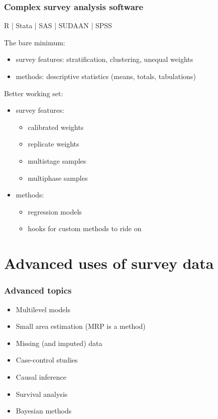 \documentclass{beamer}
\begin{document}
\begin{frame}\frametitle{Complex survey analysis software}

R | Stata | SAS | SUDAAN | SPSS

\bigskip

The bare minimum:
\begin{itemize}
    \item survey features: stratification, clustering, unequal weights
    \item methods: descriptive statistics (means, totals, tabulations)
\end{itemize}

Better working set:
\begin{itemize}
    \item survey features:
    \begin{itemize}
        \item calibrated weights
        \item replicate weights
        \item multistage samples
        \item multiphase samples
    \end{itemize}
    \item methods:
    \begin{itemize}
        \item regression models
        \item hooks for custom methods to ride on
    \end{itemize}
\end{itemize}

\end{frame}



\section{Advanced uses of survey data}

\begin{frame}\frametitle{Advanced topics}

\begin{itemize}
    \item Multilevel models
    \item Small area estimation (MRP is a method)
    \item Missing (and imputed) data
    \item Case-control studies
    \item Causal inference
    \item Survival analysis
    \item Bayesian methods
\end{itemize}

\end{frame}
\end{document}
